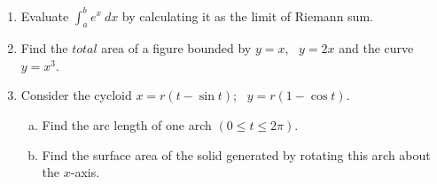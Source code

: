 \documentclass[journal,12pt,twocolumn]{IEEEtran}
\begin{document}
\begin{enumerate}
\begin{itemize}
\end{itemize}


\item Evaluate $\int_{a}^{b} e^x \ dx$ by calculating it as the limit of Riemann sum.
\\
\item Find the $total$ area of a figure bounded by $y=x$, \ $y=2x$ and the curve $y=x^3$.
\\
\item Consider the cycloid $x=r(t-\sin t)$; \ $y=r(1-\cos t)$.\\

\begin{enumerate}[(a)]

\item Find the arc length of one arch $(0\leqslant t \leqslant 2\pi)$.
\item Find the surface area of the solid generated by rotating this arch about the $x$-axis.
\end{enumerate}


\end{enumerate}

\end{document}
